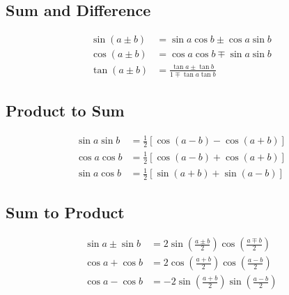 \documentclass[11pt]{article}
\begin{document}
\subsection*{Sum and Difference}
\[
\begin{aligned}
\sin(a \pm b) &= \sin a \cos b \pm \cos a \sin b \\
\cos(a \pm b) &= \cos a \cos b \mp \sin a \sin b \\
\tan(a \pm b) &= \frac{\tan a \pm \tan b}{1 \mp \tan a \tan b}
\end{aligned}
\]

\subsection*{Product to Sum}
\[
\begin{aligned}
\sin a \sin b &= \frac{1}{2}[\cos(a - b) - \cos(a + b)] \\
\cos a \cos b &= \frac{1}{2}[\cos(a - b) + \cos(a + b)] \\
\sin a \cos b &= \frac{1}{2}[\sin(a + b) + \sin(a - b)]
\end{aligned}
\]

\subsection*{Sum to Product}
\[
\begin{aligned}
\sin a \pm \sin b &= 2 \sin\left(\frac{a \pm b}{2}\right) \cos\left(\frac{a \mp b}{2}\right) \\
\cos a + \cos b &= 2 \cos\left(\frac{a + b}{2}\right) \cos\left(\frac{a - b}{2}\right) \\
\cos a - \cos b &= -2 \sin\left(\frac{a + b}{2}\right) \sin\left(\frac{a - b}{2}\right)
\end{aligned}
\]
\end{document}
